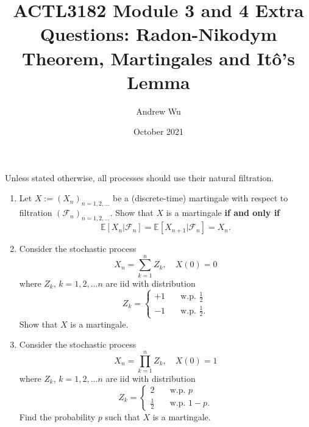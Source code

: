 \documentclass[11pt]{article}
\title{\textbf{ACTL3182 Module 3 and 4 Extra Questions: Radon-Nikodym Theorem, Martingales and It\^o's Lemma}}
\author{Andrew Wu}
\date{October 2021}
\newcommand{\E}{\mathbb{E}}
\begin{document}
	\maketitle
	Unless stated otherwise, all processes should use their natural filtration.
	\begin{enumerate}
		\item Let \( X:=(X_n)_{n=1,2,\ldots} \) be a (discrete-time) martingale with respect to filtration \( (\mathcal{F}_n)_{n=1,2,\ldots} \). Show that \( X \) is a martingale \textbf{if and only if} 
		\[
			\E[X_n |\mathcal{F}_n] = \E[X_{n+1}|\mathcal{F}_n] = X_n.
			\]
		\item Consider the stochastic process 
		\[	X_n = \sum_{k=1}^{n}Z_{k},\quad X(0) = 0
		\]
		where $Z_{k}$, $k=1,2,...n$ are iid with distribution 
		\[	Z_{k} = \begin{cases}
			+1 &  \quad \text{w.p. } \frac{1}{2} \\
			-1 & \quad \text{w.p. } \frac{1}{2}.
		\end{cases}
		\]
		Show that \( X \) is a martingale.
		\item Consider the stochastic process 
		\[
			X_n = \prod_{k=1}^{n}Z_{k},\quad X(0) = 1
			\]
		where $Z_{k}$, $k=1,2,...n$ are iid with distribution 
		\[	Z_{k} = \begin{cases}
			2 &  \quad \text{w.p. } p \\
			\frac{1}{2} & \quad \text{w.p. } 1-p.
		\end{cases}
		\]
		Find the probability \( p \) such that \( X \) is a martingale.
		

\end{enumerate}
\end{document}
